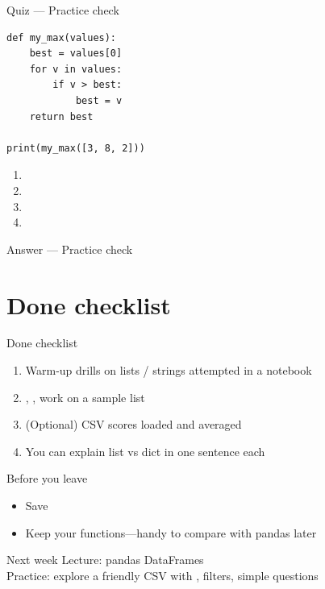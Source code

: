 \documentclass[aspectratio=169,11pt]{beamer}
\begin{document}
    \begin{frame}[fragile]{Quiz --- Practice check}
        \begin{lstlisting}
def my_max(values):
    best = values[0]
    for v in values:
        if v > best:
            best = v
    return best

print(my_max([3, 8, 2]))
        \end{lstlisting}
        \begin{enumerate}
            \item {}
            \item {}
            \item {}
            \item \pycode{[3, 8, 2]}
        \end{enumerate}
        \quizpause
    \end{frame}

    \begin{frame}{Answer --- Practice check}
    \end{frame}

    \section{Done checklist}

    \begin{frame}{Done checklist}
        \begin{enumerate}
            \item Warm-up drills on lists / strings attempted in a notebook
            \item {}, ,  work on a sample list
            \item (Optional) CSV scores loaded and averaged
            \item You can explain list vs dict in one sentence each
        \end{enumerate}
    \end{frame}

    \begin{frame}{Before you leave}
        \begin{itemize}
            \item Save 
            \item Keep your functions---handy to compare with pandas later
        \end{itemize}
        \vspace{0.6em}
        \begin{block}{Next week}
            Lecture: pandas DataFrames\\
            Practice: explore a friendly CSV with , filters, simple questions
        \end{block}
    \end{frame}
\end{document}
